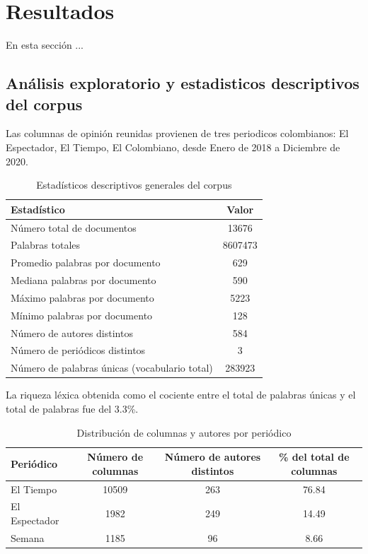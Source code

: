 \documentclass[11pt,a4paper]{article}
\begin{document}
	
	\section{Resultados}
	
	En esta sección ...
	
	\subsection{Análisis exploratorio y estadisticos descriptivos del corpus}
	Las columnas de opinión reunidas provienen de tres periodicos colombianos: El Espectador, El Tiempo, El Colombiano, desde Enero de 2018 a Diciembre de 2020. 
	
	\begin{table}[H]
		\centering
		\caption{Estadísticos descriptivos generales del corpus}
		\label{tab:estadisticos_generales}
		\begin{tabular}{l c}
			\hline
			\textbf{Estadístico} & \textbf{Valor} \\
			\hline
			Número total de documentos & 13676\\
			Palabras totales & 8607473\\
			Promedio palabras por documento & 629\\
			Mediana palabras por documento & 590\\
			Máximo palabras por documento & 5223\\
			Mínimo palabras por documento & 128\\
			Número de autores distintos & 584\\
			Número de periódicos distintos & 3\\
			Número de palabras únicas (vocabulario total) & 283923\\
			\hline
		\end{tabular}
	\end{table}
	
	La riqueza léxica obtenida como el cociente entre el total de palabras únicas y el total de palabras fue del 3.3\%.
	
	
	\begin{table}[H]
		\centering
		\caption{Distribución de columnas y autores por periódico}
		\label{tab:col_autores_periodico}
		\begin{tabular}{l c c c}
			\hline
			\textbf{Periódico} & \textbf{Número de columnas} & \textbf{Número de autores distintos} & \textbf{\% del total de columnas} \\
			\hline
			El Tiempo & 10509 & 263 & 76.84\\
			El Espectador & 1982 &  249 & 14.49\\
			Semana & 1185 & 96  & 8.66\\
			\hline
		\end{tabular}
	\end{table}
	
\end{document}
